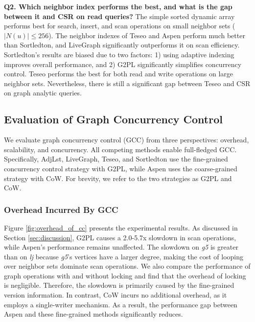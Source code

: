 \vspace{2pt}
\noindent\textbf{Q2. Which neighbor index performs the best, and what is the gap between it and CSR on read queries?} The simple sorted dynamic array performs best for search, insert, and scan operations on small neighbor sets ($|N(u)| \leqslant 256$). The neighbor indexes of Teseo and Aspen perform much better than Sortledton, and LiveGraph significantly outperforms it on scan efficiency. Sortledton's results are biased due to two factors: 1) using adaptive indexing improves overall performance, and 2) G2PL significantly simplifies concurrency control. Teseo performs the best for both read and write operations on large neighbor sets. Nevertheless, there is still a significant gap between Teseo and CSR on graph analytic queries.

\subsection{Evaluation of Graph Concurrency Control} \label{sec:evaluation_gcc}

We evaluate graph concurrency control (GCC) from three perspectives: overhead, scalability, and concurrency. All competing methods enable full-fledged GCC. Specifically, AdjLst, LiveGraph, Teseo, and Sortledton use the fine-grained concurrency control strategy with G2PL, while Aspen uses the coarse-grained strategy with CoW. For brevity, we refer to the two strategies as G2PL and CoW.

\subsubsection{Overhead Incurred By GCC}

Figure \ref{fig:overhead_of_cc} presents the experimental results. As discussed in Section \ref{sec:discussion}, G2PL causes a 2.0-5.7x slowdown in scan operations, while Aspen’s performance remains unaffected. The slowdown on \emph{g5} is greater than on \emph{lj} because \emph{g5}’s vertices have a larger degree, making the cost of looping over neighbor sets dominate scan operations. We also compare the performance of graph operations with and without locking and find that the overhead of locking is negligible. Therefore, the slowdown is primarily caused by the fine-grained version information. In contrast, CoW incurs no additional overhead, as it employs a single-writer mechanism. As a result, the performance gap between Aspen and these fine-grained methods significantly reduces.




